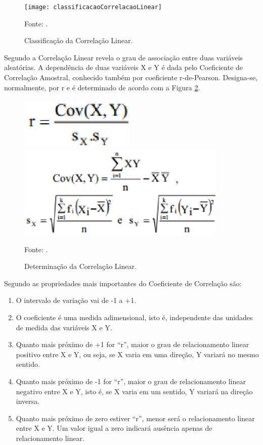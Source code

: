\graphicspath{{figuras/}}
\begin{figure}[H]
\centering
\texttt{[image: classificacaoCorrelacaoLinear]}
\caption{Classificação da Correlação Linear.}{Fonte: .} 
\label{classificacaoCorrelacaoLinear}
\end{figure}

Segundo  a Correlação Linear revela o grau de associação entre duas variáveis aleatórias. A dependência de duas variáveis X e Y é dada pelo Coeficiente de Correlação Amostral, conhecido também por coeficiente r-de-Pearson. Designa-se, normalmente, por r e é determinado de acordo com a Figura \ref{determinacaoCorrelacao}.

\begin{figure}[H]
\centering
\includegraphics[width=0.5\textwidth]{figuras/determinacaoCorrelacao1}
\includegraphics[width=0.9\textwidth]{figuras/determinacaoCorrelacao2}
\caption{Determinação da Correlação Linear.}{Fonte: .}
\label{determinacaoCorrelacao}
\end{figure}

Segundo  as propriedades mais importantes do Coeficiente de Correlação são:

\begin{enumerate}
\item O intervalo de variação vai de -1 a +1.
\item O coeficiente é uma medida adimensional, isto é, independente das unidades de medida das variáveis X e Y.
\item  Quanto mais próximo de +1 for “r”, maior o grau de relacionamento linear positivo entre X e Y, ou seja, se X varia em uma direção, Y variará no mesmo sentido.
\item Quanto mais próximo de -1 for “r”, maior o grau de relacionamento linear negativo entre X e Y, isto é, se X varia em um sentido, Y variará na direção inversa.
\item Quanto mais próximo de zero estiver “r”, menor será o relacionamento linear entre X e Y. Um valor igual a zero indicará ausência apenas de relacionamento linear.
\end{enumerate}

